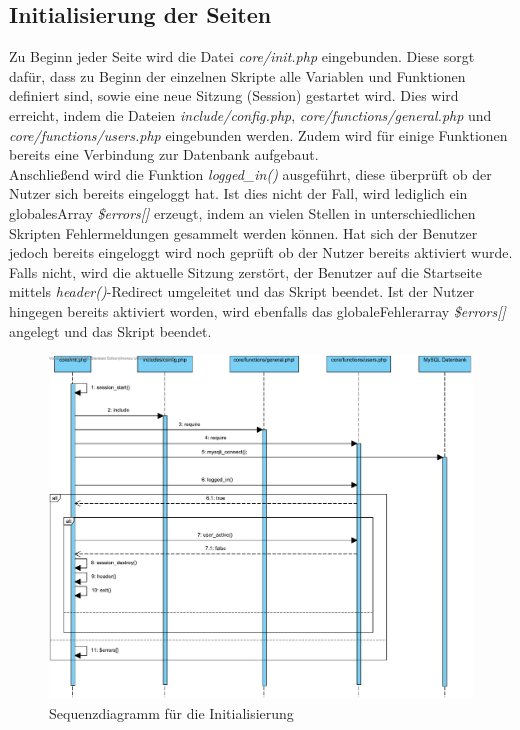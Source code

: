 \documentclass[fontsize = 12pt, paper = a4]{scrreprt}
\begin{document}
\subsection{Initialisierung der Seiten}
Zu Beginn jeder Seite wird die Datei \textit{core/init.php} eingebunden. Diese sorgt dafür, dass zu Beginn der einzelnen Skripte alle Variablen und Funktionen definiert sind, sowie eine neue Sitzung (Session) gestartet wird. Dies wird erreicht, indem die Dateien \textit{include/config.php}, \textit{core/functions/general.php} und \textit{core/functions/users.php} eingebunden werden. Zudem wird für einige Funktionen bereits eine Verbindung zur Datenbank aufgebaut.\\
Anschließend wird die Funktion \textit{logged\_in()} ausgeführt, diese überprüft ob der Nutzer sich bereits eingeloggt hat. Ist dies nicht der Fall, wird lediglich ein \glqq globales\grqq Array \textit{\$errors[]} erzeugt, indem an vielen Stellen in unterschiedlichen Skripten Fehlermeldungen gesammelt werden können. Hat sich der Benutzer jedoch bereits eingeloggt wird noch geprüft ob der Nutzer bereits aktiviert wurde. Falls nicht, wird die aktuelle Sitzung zerstört, der Benutzer auf die Startseite mittels \textit{header()}-Redirect umgeleitet und das Skript beendet. Ist der Nutzer hingegen bereits aktiviert worden, wird ebenfalls das \glqq globale\grqq Fehlerarray \textit{\$errors[]} angelegt und das Skript beendet.

\begin{figure}[h]
\centering
\includegraphics[scale = 0.55]{initialisierung}
\caption[Sequenzdiagramm f\"{u}r die Initialisierung]{Sequenzdiagramm f\"{u}r die Initialisierung}
\label{init}
\end{figure}
\end{document}
